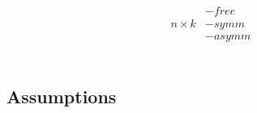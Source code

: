\documentclass[first,firstsupp,lastsupp,last,hyperref,table]{ETHclass}
\begin{document}
\begin{frame}
\begin{columns}[c]
\begin{column}{0.45\textwidth}
\begin{figure}
\end{figure}
\vspace{-0.25cm}
\begin{equation*}
\begin{aligned}
&-free\\
n\times k&-symm\\
&-asymm\\
\end{aligned}
\end{equation*}
\end{column}
\end{columns}
\end{frame}

\subsection{Assumptions}
\end{document}
